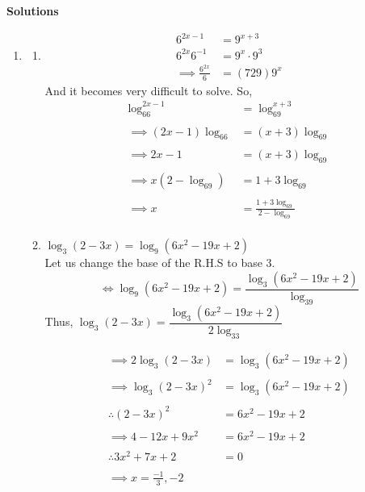 \documentclass[11pt,a4paper]{article}
\begin{document}
\textbf{Solutions}
\begin{enumerate}
\item[]
\begin{enumerate}
       \item


\begin{align*}
6^{2x-1} & = 9^{x+3}\\
6^{2x}6^{-1} & = 9^x\cdot 9^3\\
\implies \frac{6^{2x}}{6} & = (729)9^x
\end{align*}
And it becomes very difficult to solve. So,
\begin{align*}
\log_66^{2x-1} & = \log_69^{x+3}\\\\
\implies (2x-1)\log_66 & = (x+3)\log_69\\\\
\implies 2x-1 & = (x+3)\log_69\\\\
\implies x(2-\log_69) & = 1+3\log_69\\\\
\implies x & = \frac{1+3\log_69}{2-\log_69}\\
\end{align*}



        \item $\log_3(2-3x)=\log_9(6x^2-19x+2)$\\
        
Let us change the base of the R.H.S to base 3.
$$\iff \log_9(6x^2-19x+2)=\frac{\log_3(6x^2-19x+2)}{\log_39}$$
Thus, $\log_3(2-3x)=\dfrac{\log_3(6x^2-19x+2)}{2\log_33}$

\begin{align*}
\implies 2\log_3(2-3x) & = \log_3(6x^2-19x+2)\\\\
\implies \log_3(2-3x)^2 & = \log_3(6x^2-19x+2)\\\\
\therefore (2-3x)^2 & = 6x^2-19x+2\\\\
\implies 4-12x+9x^2 & = 6x^2-19x+2\\\\
\therefore 3x^2+7x+2 & = 0\\\\
\implies x=\frac{-1}{3},-2\\
\end{align*}
\end{enumerate}
\end{enumerate}
\end{document}
